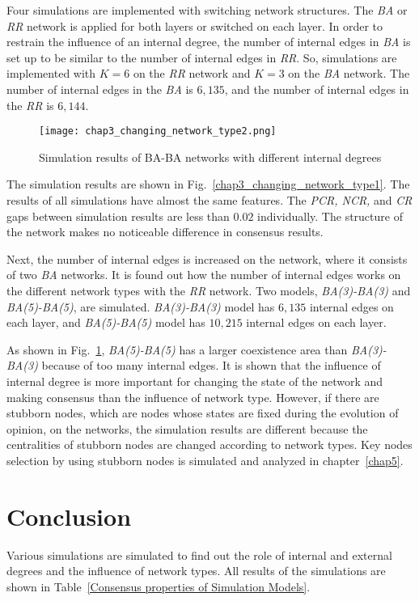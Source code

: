 Four simulations are implemented with switching network structures. The \textit{BA} or \textit{RR} network is applied for both layers or switched on each layer. In order to restrain the influence of an internal degree, the number of internal edges in \textit{BA} is set up to be similar to the number of internal edges in \textit{RR}. So, simulations are implemented with $K=6$ on the \textit{RR} network and $K=3$ on the \textit{BA} network. The number of internal edges in the \textit{BA} is $6,135$, and the number of internal edges in the \textit{RR} is $6,144$.

\begin{figure}[!htb]
	\centering
	\texttt{[image: chap3\_changing\_network\_type2.png]}
	\caption{Simulation results of BA-BA networks with different internal degrees}
	\label{chap3_changing_network_type2}
\end{figure}

The simulation results are shown in Fig.~\ref{chap3_changing_network_type1}. The results of all simulations have almost the same features. The \textit{PCR, NCR,} and \textit{CR} gaps between simulation results are less than $0.02$ individually. The structure of the network makes no noticeable difference in consensus results. 

Next, the number of internal edges is increased on the network, where it consists of two \textit{BA} networks. It is found out how the number of internal edges works on the different network types with the \textit{RR} network. Two models, \textit{BA(3)-BA(3)} and \textit{BA(5)-BA(5)}, are simulated. \textit{BA(3)-BA(3)} model has $6,135$ internal edges on each layer, and \textit{BA(5)-BA(5)} model has $10,215$ internal edges on each layer.

As shown in Fig.~\ref{chap3_changing_network_type2}, \textit{BA(5)-BA(5)} has a larger coexistence area than \textit{BA(3)-BA(3)} because of too many internal edges. It is shown that the influence of internal degree is more important for changing the state of the network and making consensus than the influence of network type. However, if there are stubborn nodes, which are nodes whose states are fixed during the evolution of opinion, on the networks, the simulation results are different because the centralities of stubborn nodes are changed according to network types. Key nodes selection by using stubborn nodes is simulated and analyzed in chapter~\ref{chap5}.\\

\section{Conclusion}
Various simulations are simulated to find out the role of internal and external degrees and the influence of network types. All results of the simulations are shown in Table~\ref{Consensus properties of Simulation Models}.
 
